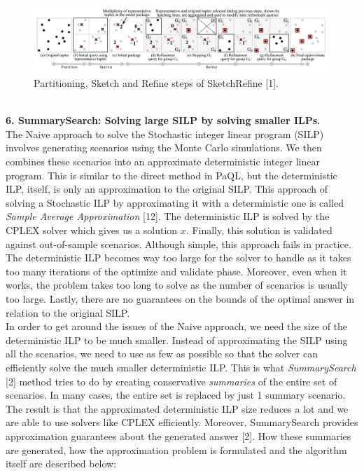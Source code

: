 \documentclass[a4paper,12pt]{article}
\begin{document}
\\
\begin{figure}[h]
\includegraphics[scale=.5]{12}
\caption{Partitioning, Sketch and Refine steps of SketchRefine [1].}
\end{figure}
\\
\vspace{5mm}
\textbf{6. SummarySearch: Solving large SILP by solving smaller ILPs.}
\\

The Naive approach to solve the Stochastic integer linear program (SILP) involves generating scenarios using the Monte Carlo simulations. We then combines these scenarios into an approximate deterministic integer linear program. This is similar to the direct method in PaQL, but the deterministic ILP, itself, is only an approximation to the original SILP. This approach of solving a Stochastic ILP by approximating it with a deterministic one is called \textit{Sample Average Approximation} [12]. The deterministic ILP is solved by the CPLEX solver which gives us a solution $x$. Finally, this solution is validated against out-of-sample scenarios. Although simple, this approach fails in practice. The deterministic ILP becomes way too large for the solver to handle as it takes too many iterations of the optimize and validate phase. Moreover, even when it works, the problem takes too long to solve as the number of scenarios is usually too large. Lastly, there are no guarantees on the bounds of the optimal answer in relation to the original SILP.
\\

In order to get around the issues of the Naive approach, we need the size of the deterministic ILP to be much smaller. Instead of approximating the SILP using all the scenarios, we need to use as few as possible so that the solver can efficiently solve the much smaller deterministic ILP. This is what \textit{SummarySearch} [2] method tries to do by creating conservative \textit{summaries} of the entire set of scenarios. In many cases, the entire set is replaced by just 1 summary scenario. The result is that the approximated deterministic ILP size reduces a lot and we are able to use solvers like CPLEX efficiently. Moreover, SummarySearch provides approximation guarantees about the generated answer [2]. How these summaries are generated, how the approximation problem is formulated and the algorithm itself are described below:
\\
\end{document}
